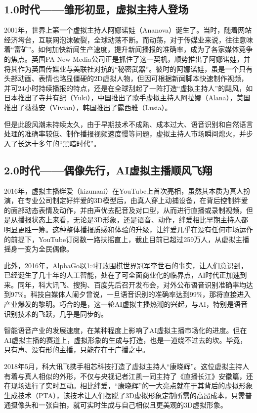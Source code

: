 \documentclass[11pt, a4paper, oneside]{ctexbook}
\begin{document}
\subsection{1.0时代——雏形初显，虚拟主持人登场}
2001年，世界上第一个虚拟主持人阿娜诺娃（Ananova）诞生了。当时，随着网站经济垮台，互联网泡沫破裂，全球动荡不断。而动荡，对于传媒业来说，往往意味着“富矿”。如何加快新闻生产速度，提升新闻播报的准确率，成为了各家媒体竞争的焦点。英国PA New Media公司正是抓住了这一契机，顺势推出了阿娜诺娃，并将其作为英国传媒业与美联社对抗的“秘密武器”。彼时的阿娜诺娃，虽是一个只有头部动画、表情也略显僵硬的2D虚拟人物，但因可根据新闻脚本快速制作视频，并可24小时持续播报的特点，还是在全球刮起了一阵打造“虚拟主持人”的飓风，如日本推出了寺井有纪（Yuki），中国推出了歌手虚拟主持人阿拉娜（Alana），美国推出了薇薇安（Vivian），韩国推出了露西雅（Lusia）。

但是此股风潮未持续太久，由于早期技术不成熟、成本过大、语音识别和自然语言处理的准确率较低、制作播报视频速度慢等问题，虚拟主持人市场瞬间熄火，并步入了长达十多年的“黑暗时代”。
\subsection{2.0时代——偶像先行，AI虚拟主播顺风飞翔}
2016年，虚拟主播绊爱（kizunaai）在YouTube上首次亮相，虽然其本质为真人扮演，在专业公司制定好绊爱的3D模型后，由真人穿上动捕设备，在背后控制绊爱的面部动态表情及动作，并由声优去配音及对口型，从而进行直播或录制视频，但是从播报状态上来看，无论是3D形象，还是语音、动作，绊爱相比早期主持人都明显更胜一筹。这种整体播报质感和体验的升级，让绊爱几乎在没有任何市场运作的前提下，YouTube订阅数一路扶摇直上，截止目前已超过259万人，从虚拟主播摇身一变为全民偶像。

此外，2016年，AlphaGo以1:4打败围棋世界冠军李世石的事实，让人们意识到，已经诞生了几十年的人工智能，处在了可全面商业化的临界点，AI时代正加速到来。同年，科大讯飞、搜狗、百度先后召开发布会，对外公布语音识别准确率均达到97\%。科技自媒体人阑夕曾说，一旦语音识别的准确率达到99\%，那将直接进入产业爆发的黎明。巧合的是，这一轮AI虚拟主播热潮的兴起，与AI，特别是语音识别技术的飞跃，几乎是同步的。

智能语音产业的发展速度，在某种程度上影响了AI虚拟主播市场化的进度。但在AI虚拟主播的赛道上，虚拟形象的生成与打造，也是一道绕不过去的坎。毕竟，只有声、没有形的主播，只能存在于广播之中。

2018年5月，科大讯飞携手相芯科技打造了虚拟主持人“康晓辉”。这位虚拟主持人有着与真人相似的外形，不仅与央视记者江凯一同主持了《直播长江》安徽篇，还在现场进行了实时互动。相比绊爱，“康晓辉”的一大亮点就在于其背后的虚拟形象生成技术（PTA），该技术让人们摆脱了3D虚拟形象定制所需的高昂成本，只需普通摄像头和一张自拍，就可实时生成与自己相似且更美观的3D虚拟形象。
\end{document}
